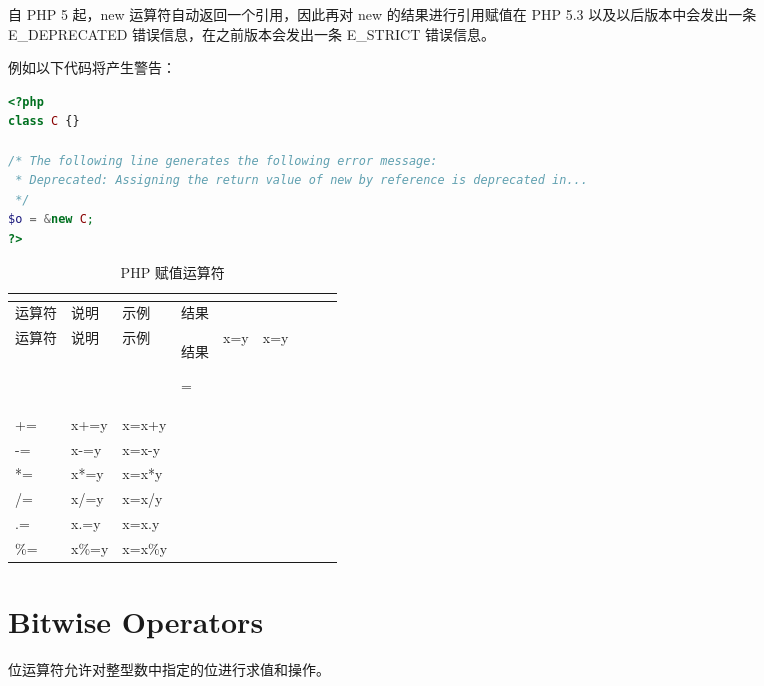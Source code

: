 自 PHP 5 起，new 运算符自动返回一个引用，因此再对 new 的结果进行引用赋值在 PHP 5.3 以及以后版本中会发出一条 E\_DEPRECATED 错误信息，在之前版本会发出一条 E\_STRICT 错误信息。

例如以下代码将产生警告：

\begin{lstlisting}[language=PHP]
<?php
class C {}

/* The following line generates the following error message:
 * Deprecated: Assigning the return value of new by reference is deprecated in...
 */
$o = &new C;
?>
\end{lstlisting}

\begin{longtable}{|m{35pt}|m{180pt}|m{80pt}|m{30pt}|}
\tabularnewline\hline
运算符	&说明	&示例	&结果
\endhead

\caption{PHP 赋值运算符}\\
\hline
运算符	&说明	&示例	&结果
\endfirsthead

\endfoot

\endlastfoot
\hline
=		&x=y		&x=y&\\
\hline
+\/=	&x+\/=y	&x=x+y&\\
\hline
-\/=		&x-\/=y		&x=x-y&\\
\hline
*\/=	&x*\/=y	&x=x*y&\\
\hline
/\/=		&x/\/=y		&x=x/y&\\
\hline
.\/=		&x.\/=y		&x=x.y&\\
\hline
\%\/=	&x\%\/=y	&x=x\%y&\\
\hline
\end{longtable}

\section{Bitwise Operators}


位运算符允许对整型数中指定的位进行求值和操作。

